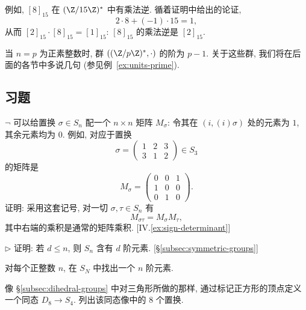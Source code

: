 例如, $[8]_{15}$ 在 $(\Z/15\Z)^{*}$ 中有乘法逆. 循着证明中给出的论证,
\[
2 \cdot 8 + (-1) \cdot 15 = 1,
\]
从而 $[2]_{15} \cdot [8]_{15} = [1]_{15}$: $[8]_{15}$ 的乘法逆是 $[2]_{15}$.

当 $n = p$ 为正素整数时, 群 $((\Z/p\Z)^{*}, \cdot)$ 的阶为 $p - 1$. 关于这些群, 我们将在后面的各节中多说几句 (参见例~\ref{ex:units-prime}).

\subsection*{习题}
{}

\begin{prob}
\label{ex:permutation-matrix}
$\neg$ 可以给置换 $\sigma \in S_n$ 配一个 $n \times n$ 矩阵 $M_{\sigma}$: 令其在 $(i, (i)\sigma)$ 处的元素为 $1$, 其余元素均为 $0$. 例如, 对应于置换
\[
\sigma = \begin{pmatrix} 1 & 2 & 3 \\ 3 & 1 & 2 \end{pmatrix} \in S_3
\]
的矩阵是
\[
M_{\sigma} = \begin{pmatrix} 0 & 0 & 1 \\ 1 & 0 & 0 \\ 0 & 1 & 0 \end{pmatrix}.
\]
证明: 采用这套记号, 对一切 $\sigma, \tau \in S_n$ 有
\[
M_{\sigma\tau} = M_{\sigma} M_{\tau},
\]
其中右端的乘积是通常的矩阵乘积. [IV.\ref{ex:sign-determinant}]
\end{prob}

\begin{prob}
\label{ex:order-d-in-sn}
$\triangleright$ 证明: 若 $d \leq n$, 则 $S_n$ 含有 $d$ 阶元素. [\S\ref{subsec:symmetric-groups}]
\end{prob}

\begin{prob}
\label{ex:order-n-in-sn}
对每个正整数 $n$, 在 $S_N$ 中找出一个 $n$ 阶元素.
\end{prob}

\begin{prob}
\label{ex:D8-to-S4}
像 \S\ref{subsec:dihedral-groups} 中对三角形所做的那样, 通过标记正方形的顶点定义一个同态 $D_8 \to S_4$. 列出该同态像中的 $8$ 个置换.
\end{prob}

